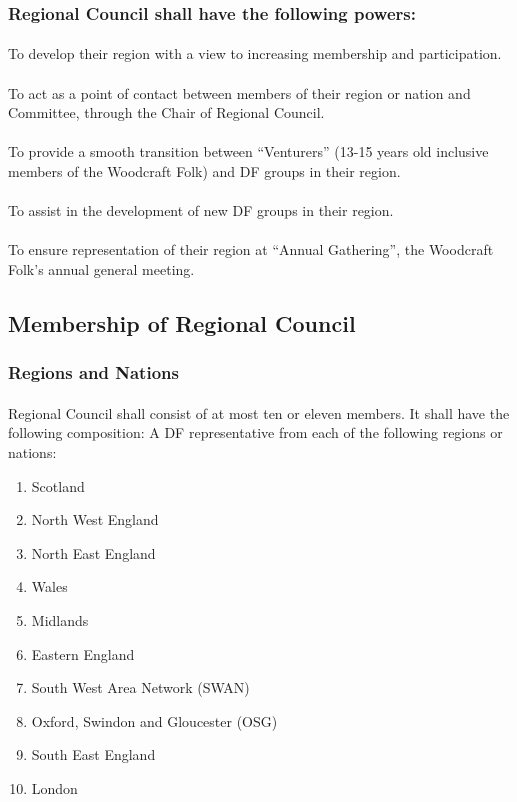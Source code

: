 \documentclass[a4paper, 12pt]{report}
\begin{document}
\subsubsection{Regional Council shall have the following powers:}
\paragraph{}
To develop their region with a view to increasing membership and participation.
\paragraph{}
To act as a point of contact between members of their region or nation and Committee, through the Chair of Regional Council.
\paragraph{}
To provide a smooth transition between ``Venturers'' (13-15 years old inclusive members of the Woodcraft Folk) and DF groups in their region.
\paragraph{}
To assist in the development of new DF groups in their region.
\paragraph{}
To ensure representation of their region at ``Annual Gathering'', the Woodcraft Folk's annual general meeting.

\subsection{Membership of Regional Council}
\label{sec:rcmembership}
\subsubsection{Regions and Nations}
\label{sec:regionsandnations}
\paragraph{} Regional Council shall consist of at most ten or eleven members. It shall have the following composition: A DF representative from each of the following regions or nations:
\begin{enumerate}[\hspace{0.5cm}(a)]
\item Scotland
\item North West England
\item North East England
\item Wales
\item Midlands
\item Eastern England
\item South West Area Network (SWAN)
\item Oxford, Swindon and Gloucester (OSG) 
\item South East England
\item London
\end{enumerate}
\end{document}
